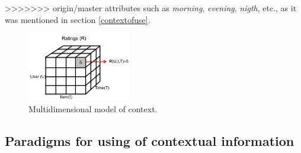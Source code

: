 >>>>>>> origin/master
attributes such as \textit{morning}, \textit{evening},  \textit{nigth},
etc., as it was mentioned in section  \ref{contextofuse}. 
\begin{figure}
\captionsetup{font=footnotesize}
\centering
\includegraphics[width=0.40\textwidth]{img/multidimension.png}
\small
\caption{Multidimensional model of context.}
\label{fig:multidimension}   
\end{figure}

\subsection{Paradigms for using of contextual information}

